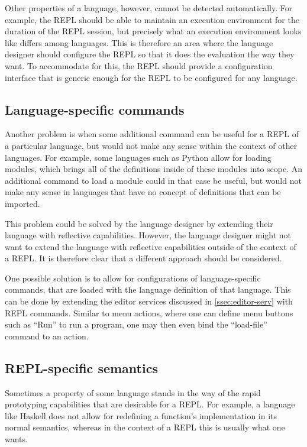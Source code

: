 Other properties of a language, however, cannot be detected
automatically. For example, the REPL should be able to maintain an
execution environment for the duration of the REPL session, but
precisely what an execution environment looks like differs among
languages. This is therefore an area where the language designer
should configure the REPL so that it does the evaluation the way they
want. To accommodate for this, the REPL should provide a configuration
interface that is generic enough for the REPL to be configured
for any language.

\subsection{Language-specific commands}
\label{ssec:lang-spec-addit}
Another problem is when some additional command can be useful for a
REPL of a particular language, but would not make any sense within the
context of other languages. For example, some languages such as Python
allow for loading modules, which brings all of the definitions inside
of these modules into scope. An additional command to load a module
could in that case be useful, but would not make any sense in
languages that have no concept of definitions that can be imported.

This problem could be solved by the language designer by extending
their language with reflective capabilities. However, the language
designer might not want to extend the language with reflective
capabilities outside of the context of a REPL. It is therefore clear
that a different approach should be considered.

One possible solution is to allow for configurations of
language-specific commands, that are loaded with the language
definition of that language. This can be done by extending the editor
services discussed in \cref{ssec:editor-serv} with REPL
commands. Similar to menu actions, where one can define menu buttons
such as ``Run'' to run a program, one may then even bind the
``load-file'' command to an action.

\subsection{REPL-specific semantics}
\label{ssec:repl-spec-semant}
Sometimes a property of some language stands in the way of the rapid
prototyping capabilities that are desirable for a REPL. For example, a
language like Haskell does not allow for redefining a function's
implementation in its normal semantics, whereas in the context of a
REPL this is usually what one wants.

